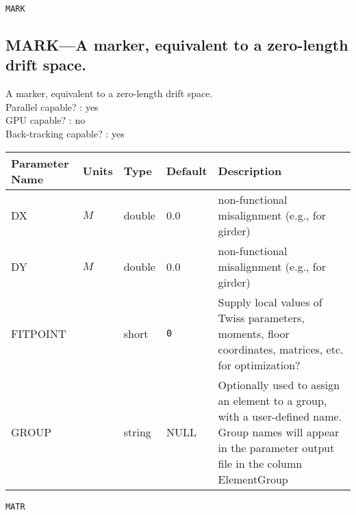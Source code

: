 \newpage
\begin{center}{\Large\verb|MARK|}\end{center}
\subsection{MARK---A marker, equivalent to a zero-length drift space.}
A marker, equivalent to a zero-length drift space.
\\
Parallel capable? : yes\\
GPU capable? : no\\
Back-tracking capable? : yes\\
\begin{tabular}{|l|l|l|l|p{\descwidth}|} \hline
Parameter Name & Units & Type & Default & Description \\ \hline 
DX & $M$ & double &  0.0 & non-functional misalignment (e.g., for girder)  \\ \hline 
DY & $M$ & double &  0.0 & non-functional misalignment (e.g., for girder)  \\ \hline 
FITPOINT &  & short &  \verb|0| & Supply local values of Twiss parameters, moments, floor coordinates, matrices, etc. for optimization?  \\ \hline 
GROUP &  & string & NULL & Optionally used to assign an element to a group, with a user-defined name.  Group names will appear in the parameter output file in the column ElementGroup  \\ \hline 
\end{tabular}

\vspace*{0.5in}

\newpage
\begin{center}{\Large\verb|MATR|}\end{center}

